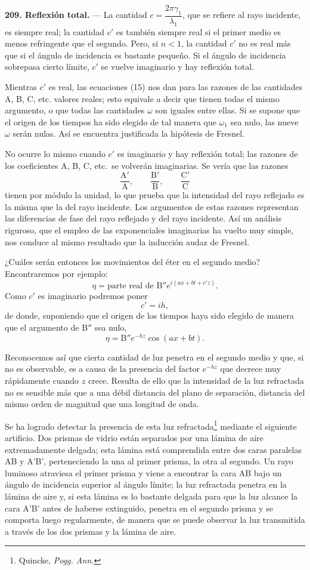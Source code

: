 \noindent\textbf{209. Reflexión total.} — La cantidad
$c=\dfrac{2\pi\gamma_1}{\lambda_1}$, que se refiere al rayo incidente, es
siempre real; la cantidad $c'$ es también siempre real si el primer medio
es menos refringente que el segundo. Pero, si $n<1$, la cantidad $c'$ no
es real más que si el ángulo de incidencia es bastante pequeño. Si el
ángulo de incidencia sobrepasa cierto límite, $c'$ se vuelve imaginario y
hay reflexión total.

Mientras $c'$ es real, las ecuaciones (15) nos dan para las razones de las
cantidades A, B, C, etc. valores reales; esto equivale a decir que tienen
todas el mismo argumento, o que todas las cantidades $\omega$ son iguales
entre ellas. Si se supone que el origen de los tiempos ha sido elegido de
tal manera que $\omega_1$ sea nulo, las nueve $\omega$ serán nulas. Así se
encuentra justificada la hipótesis de Fresnel.

No ocurre lo mismo cuando $c'$ es imaginario y hay reflexión total; las
razones de los coeficientes A, B, C, etc.\ se volverán imaginarias. Se
vería que las razones
\[
\frac{\mathrm{A}'}{\mathrm{A}},\qquad \frac{\mathrm{B}'}{\mathrm{B}},
\qquad \frac{\mathrm{C}'}{\mathrm{C}}
\]
tienen por módulo la unidad, lo que prueba que la intensidad del rayo
reflejado es la misma que la del rayo incidente. Los argumentos de estas
razones representan las diferencias de fase del rayo reflejado y del rayo
incidente. Así un análisis riguroso, que el empleo de las exponenciales
imaginarias ha vuelto muy simple, nos conduce al mismo resultado que la
inducción audaz de Fresnel.

¿Cuáles serán entonces los movimientos del éter en el segundo medio?
Encontraremos por ejemplo:
\[
\eta=\text{parte real de }\mathrm{B}''e^{i(ax+bt+c'z)}.
\]
Como $c'$ es imaginario podremos poner
\[
c'=ih,
\]
de donde, suponiendo que el origen de los tiempos haya sido elegido de
manera que el argumento de $\mathrm{B}''$ sea nulo,
\[
\eta=\mathrm{B}''e^{-hz}\cos(ax+bt).
\]

Reconocemos así que cierta cantidad de luz penetra en el segundo medio y
que, si no es observable, es a causa de la presencia del factor $e^{-hz}$
que decrece muy rápidamente cuando $z$ crece. Resulta de ello que la
intensidad de la luz refractada no es sensible más que a una débil
distancia del plano de separación, distancia del mismo orden de magnitud
que una longitud de onda.

Se ha logrado detectar la presencia de esta luz refractada\footnote{Quincke,
\emph{Pogg. Ann.}} mediante el siguiente artificio. Dos prismas de vidrio
están separados por una lámina de aire extremadamente delgada; esta
lámina está comprendida entre dos caras paralelas AB y A'B', perteneciendo
la una al primer prisma, la otra al segundo. Un rayo luminoso atraviesa el
primer prisma y viene a encontrar la cara AB bajo un ángulo de incidencia
superior al ángulo límite; la luz refractada penetra en la lámina de aire
y, si esta lámina es lo bastante delgada para que la luz alcance la cara
A'B' antes de haberse extinguido, penetra en el segundo prisma y se
comporta luego regularmente, de manera que se puede observar la luz
transmitida a través de los dos prismas y la lámina de aire.

